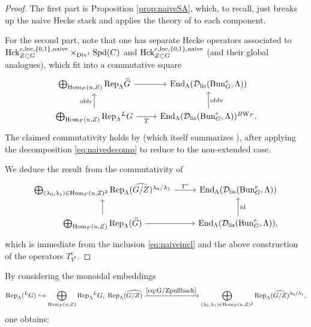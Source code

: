 \begin{proof}
    The first part is Proposition \ref{prop:naiveSA}, which, to recall, just breaks up the naive Hecke stack and applies the theory of \cite{Geometrization} to each component. 
    
    For the second part, note that one has separate Hecke operators associated to $\mathrm{Hck}_{Z \subset G}^{e,\mathrm{loc},\{0,1\},\textnormal{naive}} \times_{\mathrm{Div}^{1}} \mathrm{Spd}(C)$ and $\mathrm{Hck}_{Z \subset G}^{e,\mathrm{loc},\{0,1\},\textnormal{naive}}$ (and their global analogues), which fit into a commutative square
    \[\begin{tikzcd}
	{\bigoplus_{\Hom_{F}(u,Z)} \Rep_{\Lambda}\widehat{G}} & {\End_{\Lambda}(\mc{D}_{\tn{lis}}(\Bun_{G}^{e},\Lambda)) } \\
	{\bigoplus_{\Hom_{F}(u,Z)} \Rep_{\Lambda}{^L}G} & {\End_{\Lambda}(\mc{D}_{\tn{lis}}(\Bun_{G}^{e},\Lambda))^{B\Weil_{F}}}.
	\arrow[from=1-1, to=1-2]
	\arrow["\oblv", from=2-1, to=1-1]
	\arrow["T"', from=2-1, to=2-2]
	\arrow["\oblv"', from=2-2, to=1-2]
\end{tikzcd}\]
   The claimed commutativity holds by \cite[Theorem 1.4.4]{Hansen24} (which itself summarizes \cite{Geometrization}), after applying the decomposition \eqref{eq:naivedecomp} to reduce to the non-extended case.

   We deduce the result from the commutativity of
    \[\begin{tikzcd}
	{\bigoplus_{(\lambda_{0},\lambda_{1}) \in \Hom_{F}(u,Z)^{2}}\Rep_{\Lambda}(\widehat{G/Z})^{\lambda_{0}/\lambda_{1}}} & {\End_{\Lambda}(\mc{D}_{\tn{lis}}(\Bun_{G}^{e},\Lambda)) } \\
	{\bigoplus_{\Hom_{F}(u,Z)}\Rep_{\Lambda}({\widehat{G})}} & {\End_{\Lambda}(\mc{D}_{\tn{lis}}(\Bun_{G}^{e},\Lambda))}
	\arrow["T^{e}", from=1-1, to=1-2]
	\arrow[from=2-1, to=1-1]
	\arrow[from=2-1, to=2-2]
	\arrow["\tn{id}"', from=2-2, to=1-2],
\end{tikzcd}\]
which is immediate from the inclusion \eqref{eq:naiveincl} and the above construction of the operators $T^{e}_{V^{e}}$.
\end{proof}

 By considering the monoidal embeddings
 \begin{equation*}
   \mathrm{Rep}_{\Lambda}({^L}G) \hookrightarrow \bigoplus_{\mathrm{Hom}_{F}(u,Z)}\mathrm{Rep}_{\Lambda}{^L}G, \hspace{1mm} \mathrm{Rep}_{\Lambda}(\widehat{G/Z) } \xrightarrow{\eqref{eq:G/Zpullback}} \bigoplus_{(\lambda_{0},\lambda_{1}) \in \mathrm{Hom}_{F}(u,Z)^{2}}\mathrm{Rep}_{\Lambda}(\widehat{G/Z})^{\lambda_{0}/\lambda_{1}},
 \end{equation*}
 one obtains:

